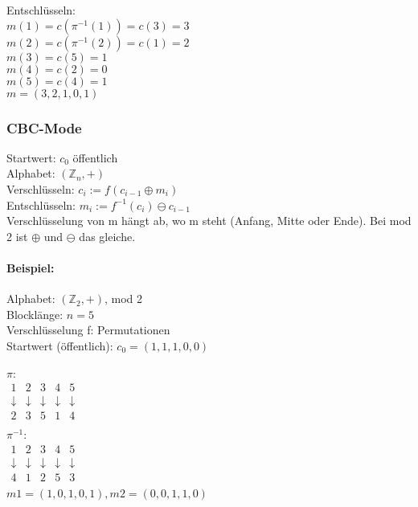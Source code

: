 Entschlüsseln:\\
$m(1)=c(\pi^{-1} (1))=c(3)=3$\\
$m(2)=c(\pi^{-1} (2))=c(1)=2$\\
$m(3)=c(5)=1$\\
$m(4)=c(2)=0$\\
$m(5)=c(4)=1$\\
$m=(3,2,1,0,1)$\\

\subsubsection{CBC-Mode} Startwert: $c_0$ öffentlich\\
Alphabet: $(\mathbb{Z}_n,+)$\\
Verschlüsseln: $c_i := f(c_{i-1} \oplus m_i)$\\
Entschlüsseln: $m_i := f^{-1}(c_i) \ominus c_{i-1}$\\
Verschlüsselung von m hängt ab, wo m steht (Anfang, Mitte oder Ende). Bei mod 2 ist $\oplus$ und $\ominus$ das gleiche. 

\paragraph{Beispiel:} Alphabet: $(\mathbb{Z}_2,+)$, mod 2\\
Blocklänge: $n=5$\\
Verschlüsselung f: Permutationen\\
Startwert (öffentlich): $c_0 = (1,1,1,0,0)$

$\pi$:\\
$\begin{array}{cccccc}
1 & 2 & 3 & 4 & 5 \\ 
\downarrow & \downarrow & \downarrow & \downarrow & \downarrow \\ 
2 & 3 & 5 & 1 & 4 \\
\end{array}$ 
\\

$\pi^{-1}$:\\
$\begin{array}{cccccc}
1 & 2 & 3 & 4 & 5 \\ 
\downarrow & \downarrow & \downarrow & \downarrow & \downarrow \\ 
4 & 1 & 2 & 5 & 3 \\
\end{array}$ 
\\

$m1=(1,0,1,0,1), m2=(0,0,1,1,0)$

